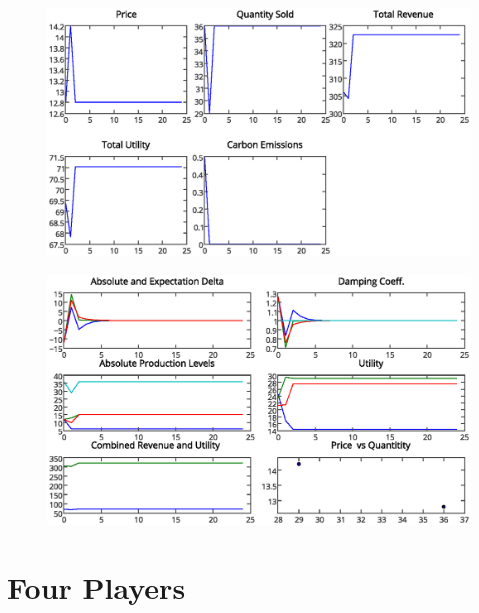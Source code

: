 \documentclass[12pt]{article}
\begin{document}
		\begin{figure}[ht!]
			\begin{center}
			\includegraphics[scale = .6]{3playertotals.eps}
			\end{center}
		\end{figure}


		\begin{figure}[ht!]
			\begin{center}
			\includegraphics[scale = .6]{3player.eps}
			\end{center}
		\end{figure}


\newpage

	\section{Four Players}
\end{document}
